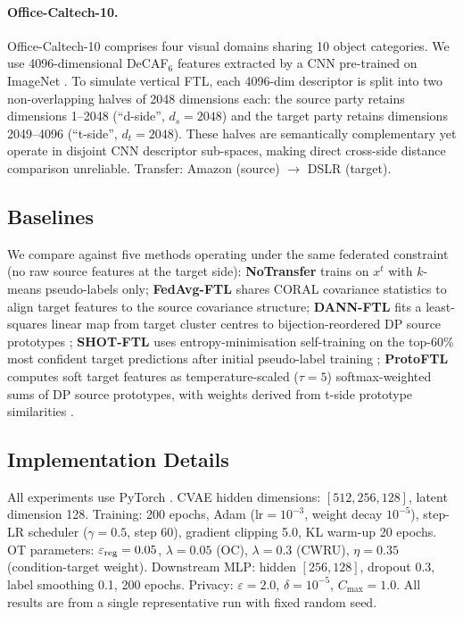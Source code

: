 \documentclass[a4paper,fleqn]{cas-sc}
\begin{document}
\paragraph{Office-Caltech-10.}
Office-Caltech-10 \citep{Gong2012} comprises four visual domains sharing
10 object categories.
We use 4096-dimensional DeCAF$_6$ features extracted by a CNN pre-trained
on ImageNet \citep{He2016}.
To simulate vertical FTL, each 4096-dim descriptor is split into two
non-overlapping halves of 2048 dimensions each:
the source party retains dimensions 1--2048 (``d-side'',
$d_s = 2048$) and the target party retains dimensions 2049--4096
(``t-side'', $d_t = 2048$).
These halves are semantically complementary yet operate in disjoint CNN
descriptor sub-spaces, making direct cross-side distance comparison
unreliable.
Transfer: Amazon (source) $\to$ DSLR (target).

\subsection{Baselines}
\label{sec:baselines}

We compare against five methods operating under the same federated
constraint (no raw source features at the target side):
\textbf{NoTransfer} trains on $x^t$ with $k$-means pseudo-labels only;
\textbf{FedAvg-FTL} shares CORAL covariance statistics to align target
features to the source covariance structure;
\textbf{DANN-FTL} fits a least-squares linear map from target cluster
centres to bijection-reordered DP source prototypes
\citep{Ganin2016};
\textbf{SHOT-FTL} uses entropy-minimisation self-training on the top-60\%
most confident target predictions after initial pseudo-label training
\citep{Liang2020};
\textbf{ProtoFTL} computes soft target features as temperature-scaled
($\tau=5$) softmax-weighted sums of DP source prototypes, with weights
derived from t-side prototype similarities \citep{Tan2022Proto}.

\subsection{Implementation Details}
\label{sec:impl}

All experiments use PyTorch \citep{Paszke2019}.
CVAE hidden dimensions: $[512,256,128]$, latent dimension 128.
Training: 200 epochs, Adam ($\text{lr}=10^{-3}$, weight decay $10^{-5}$),
step-LR scheduler ($\gamma=0.5$, step 60), gradient clipping 5.0,
KL warm-up 20 epochs.
OT parameters: $\varepsilon_{\rm reg}=0.05$, $\lambda=0.05$ (OC),
$\lambda=0.3$ (CWRU), $\eta=0.35$ (condition-target weight).
Downstream MLP: hidden $[256,128]$, dropout 0.3, label smoothing 0.1,
200 epochs.
Privacy: $\varepsilon=2.0$, $\delta=10^{-5}$, $C_{\max}=1.0$.
All results are from a single representative run with fixed random seed.
\end{document}
